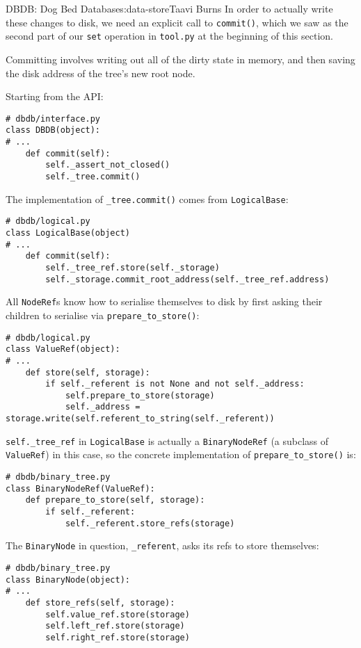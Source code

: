 \begin{aosachapter}{DBDB: Dog Bed Database}{s:data-store}{Taavi Burns}
In order to actually write these changes to disk, we need an explicit
call to \texttt{commit()}, which we saw as the second part of our
\texttt{set} operation in \texttt{tool.py} at the beginning of this
section.

Committing involves writing out all of the dirty state in memory, and
then saving the disk address of the tree's new root node.

Starting from the API:

\begin{verbatim}
# dbdb/interface.py
class DBDB(object):
# ...
    def commit(self):
        self._assert_not_closed()
        self._tree.commit()
\end{verbatim}

The implementation of \texttt{\_tree.commit()} comes from
\texttt{LogicalBase}:

\begin{verbatim}
# dbdb/logical.py
class LogicalBase(object)
# ...
    def commit(self):
        self._tree_ref.store(self._storage)
        self._storage.commit_root_address(self._tree_ref.address)
\end{verbatim}

All \texttt{NodeRef}s know how to serialise themselves to disk by first
asking their children to serialise via \texttt{prepare\_to\_store()}:

\begin{verbatim}
# dbdb/logical.py
class ValueRef(object):
# ...
    def store(self, storage):
        if self._referent is not None and not self._address:
            self.prepare_to_store(storage)
            self._address = storage.write(self.referent_to_string(self._referent))
\end{verbatim}

\texttt{self.\_tree\_ref} in \texttt{LogicalBase} is actually a
\texttt{BinaryNodeRef} (a subclass of \texttt{ValueRef}) in this case,
so the concrete implementation of \texttt{prepare\_to\_store()} is:

\begin{verbatim}
# dbdb/binary_tree.py
class BinaryNodeRef(ValueRef):
    def prepare_to_store(self, storage):
        if self._referent:
            self._referent.store_refs(storage)
\end{verbatim}

The \texttt{BinaryNode} in question, \texttt{\_referent}, asks its refs
to store themselves:

\begin{verbatim}
# dbdb/binary_tree.py
class BinaryNode(object):
# ...
    def store_refs(self, storage):
        self.value_ref.store(storage)
        self.left_ref.store(storage)
        self.right_ref.store(storage)
\end{verbatim}


\end{aosachapter}
